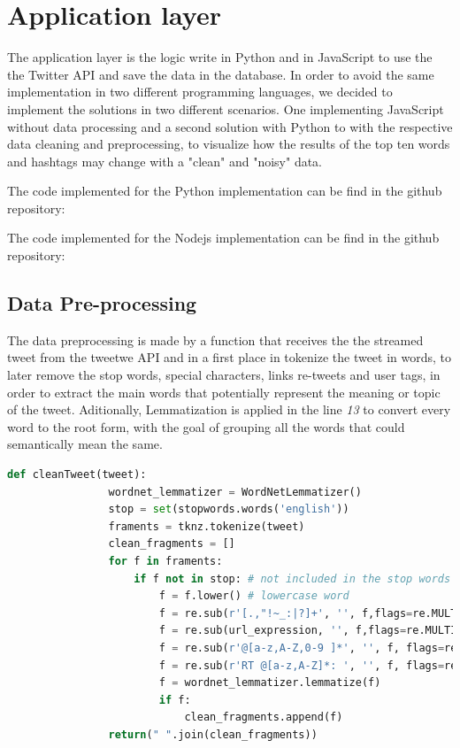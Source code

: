 \documentclass{article}
\begin{document}
        
        \section{Application layer}

        The application layer is the logic write in Python and in JavaScript to use the the Twitter API and save the data in the database. In order to avoid the same implementation in two different programming languages,
        we decided to implement the solutions in two different scenarios. One implementing JavaScript without data processing and a second solution with Python to with the respective data cleaning and preprocessing, to
        visualize how the results of the top ten words and hashtags may change with a "clean" and "noisy" data.

        The code implemented for the Python implementation can be find in the github repository: %

        The code implemented for the Nodejs implementation can be find in the github repository: %

        \subsection{Data Pre-processing}

        The data preprocessing is made by a function that receives the the streamed tweet from the tweetwe API and in a first place in tokenize the tweet in words, to later remove the stop words, special characters, links
        re-tweets and user tags, in order to extract the main words that potentially represent the meaning or topic of the tweet. Aditionally, Lemmatization is applied in the line \textit{13} to convert every word to the root 
        form, with the goal of grouping all the words that could semantically mean the same.
        \begin{lstlisting}[language=Python, caption= Tweet cleaning function, label={lst:dataCleaning}]
            def cleanTweet(tweet):    
                wordnet_lemmatizer = WordNetLemmatizer()
                stop = set(stopwords.words('english'))
                framents = tknz.tokenize(tweet)
                clean_fragments = []
                for f in framents:
                    if f not in stop: # not included in the stop words
                        f = f.lower() # lowercase word
                        f = re.sub(r'[.,"!~_:|?]+', '', f,flags=re.MULTILINE)
                        f = re.sub(url_expression, '', f,flags=re.MULTILINE) 
                        f = re.sub(r'@[a-z,A-Z,0-9 ]*', '', f, flags=re.MULTILINE) 
                        f = re.sub(r'RT @[a-z,A-Z]*: ', '', f, flags=re.MULTILINE) 
                        f = wordnet_lemmatizer.lemmatize(f)
                        if f:
                            clean_fragments.append(f)
                return(" ".join(clean_fragments))
        \end{lstlisting}
\end{document}
